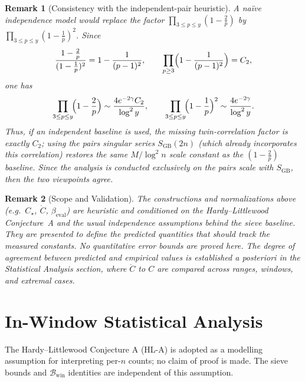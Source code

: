 \documentclass[11pt]{article}
\theoremstyle{inline}
\newtheorem*{remark}{Remark}
\theoremstyle{break}
\theoremstyle{break}
\theoremstyle{break}
\theoremstyle{break}
\theoremstyle{break}
\theoremstyle{break}
\theoremstyle{break}
\theoremstyle{inline}
\newcommand{\twin}{{\scriptscriptstyle\mathrm{win}}}
\newcommand{\Cmeas}{C}              %
\newcommand{\Cpred}{\mathring{C}}   %
\newcommand{\Bwin}{\mathcal{B}_\twin}
\newcommand{\betacal}{\beta_{\mathrm{eval}}}
\begin{document}
\begin{remark}[Consistency with the independent-pair heuristic]
A naïve independence model would replace the factor
\(\prod_{3\le p\le y}(1-\tfrac{2}{p})\) by \(\prod_{3\le p\le y}(1-\tfrac{1}{p})^2\).
Since
\begin{equation}
\frac{1-\tfrac{2}{p}}{(1-\tfrac{1}{p})^2}=1-\frac{1}{(p-1)^2},
\qquad
\prod_{p\ge3}\Bigl(1-\frac{1}{(p-1)^2}\Bigr)=C_2,
\end{equation}
one has \cite{HardyLittlewood1923, MontgomeryVaughan2007}
\begin{equation}
\prod_{3\le p\le y}\!\Bigl(1-\frac{2}{p}\Bigr)
\sim \frac{4e^{-2\gamma}C_2}{\log^2 y},
\qquad
\prod_{3\le p\le y}\!\Bigl(1-\frac{1}{p}\Bigr)^2
\sim \frac{4e^{-2\gamma}}{\log^2 y}.
\end{equation}
Thus, if an independent baseline is used, the missing twin-correlation factor
is exactly \(C_2\); using the pairs singular series \(S_{\mathrm{GB}}(2n)\) (which
already incorporates this correlation) restores the same \(M/\log^2 n\) scale
constant as the \( (1-\tfrac{2}{p}) \) baseline. Since the analysis is conducted exclusively on the
pairs scale with \(S_{\mathrm{GB}}\), then the two viewpoints agree.
\end{remark}

\begin{remark}[Scope and Validation]
The constructions and normalizations above (e.g.\ \( C_\star \), \( \Cpred \), \( \betacal \))
are heuristic and conditioned on the Hardy–Littlewood Conjecture~A and the usual
independence assumptions behind the sieve baseline. They are presented to define
the \emph{predicted} quantities that should track the \emph{measured} constants.
No quantitative error bounds are proved here. The degree of agreement between
predicted and empirical values is established \emph{a posteriori} in the
Statistical Analysis section, where \( \Cpred \) to \( \Cmeas \) are compared across ranges,
windows, and extremal cases.
\end{remark}


\section{In-Window Statistical Analysis}\label{sec:stats}

The Hardy–Littlewood Conjecture A (HL-A) is adopted as a modelling assumption for interpreting per-\( n \) counts; no claim of proof is made. The sieve bounds and \( \Bwin \) identities are independent of this assumption.
\end{document}
